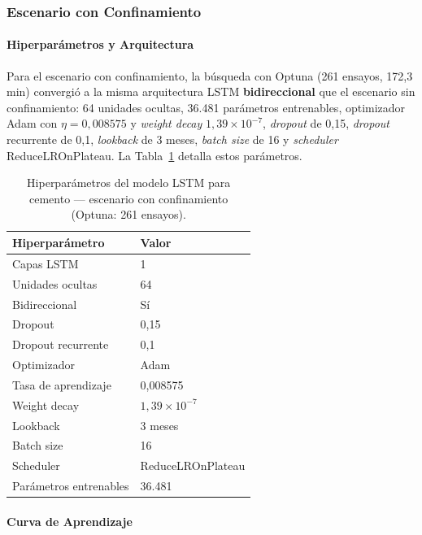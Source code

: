 
\subsubsection{Escenario con Confinamiento}

\paragraph{Hiperparámetros y Arquitectura}

\justify
Para el escenario con confinamiento, la búsqueda con Optuna (261 ensayos, 172,3 min) convergió a la misma arquitectura LSTM \textbf{bidireccional} que el escenario sin confinamiento: 64 unidades ocultas, 36.481 parámetros entrenables, optimizador Adam con $\eta=0{,}008575$ y \textit{weight decay} $1{,}39 \times 10^{-7}$, \textit{dropout} de 0,15, \textit{dropout} recurrente de 0,1, \textit{lookback} de 3 meses, \textit{batch size} de 16 y \textit{scheduler} ReduceLROnPlateau. La Tabla~\ref{tab:lstm_cemento_cc_hiper} detalla estos parámetros.

\begin{table}[H]
\centering
\caption{Hiperparámetros del modelo LSTM para cemento --- escenario con confinamiento (Optuna: 261 ensayos).}
\label{tab:lstm_cemento_cc_hiper}
\begin{tabular}{ll}
\toprule
\textbf{Hiperparámetro} & \textbf{Valor} \\
\midrule
Capas LSTM          & 1 \\
Unidades ocultas    & 64 \\
Bidireccional       & Sí \\
Dropout             & 0,15 \\
Dropout recurrente  & 0,1 \\
Optimizador         & Adam \\
Tasa de aprendizaje & 0,008575 \\
Weight decay        & $1{,}39 \times 10^{-7}$ \\
Lookback            & 3 meses \\
Batch size          & 16 \\
Scheduler           & ReduceLROnPlateau \\
Parámetros entrenables & 36.481 \\
\bottomrule
\end{tabular}
\end{table}

\paragraph{Curva de Aprendizaje}

